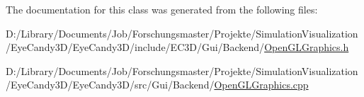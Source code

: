 The documentation for this class was generated from the following files\+:\begin{DoxyCompactItemize}
\item 
D\+:/\+Library/\+Documents/\+Job/\+Forschungsmaster/\+Projekte/\+Simulation\+Visualization/\+Eye\+Candy3\+D/\+Eye\+Candy3\+D/include/\+E\+C3\+D/\+Gui/\+Backend/\mbox{\hyperlink{_open_g_l_graphics_8h}{Open\+G\+L\+Graphics.\+h}}\item 
D\+:/\+Library/\+Documents/\+Job/\+Forschungsmaster/\+Projekte/\+Simulation\+Visualization/\+Eye\+Candy3\+D/\+Eye\+Candy3\+D/src/\+Gui/\+Backend/\mbox{\hyperlink{_open_g_l_graphics_8cpp}{Open\+G\+L\+Graphics.\+cpp}}\end{DoxyCompactItemize}
